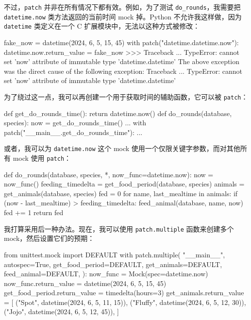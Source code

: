 不过，\texttt{patch} 并非在所有情况下都有效。例如，为了测试 \texttt{do\_rounds}，我需要把 \texttt{datetime.now} 类方法返回的当前时间 mock 掉。Python 不允许我这样做，因为 \texttt{datetime} 类定义在一个 C 扩展模块中，无法以这种方式被修改：

\begin{codebox}[python]
fake_now = datetime(2024, 6, 5, 15, 45)
with patch("datetime.datetime.now"):
    datetime.now.return_value = fake_now
>>>
Traceback ...
TypeError: cannot set 'now' attribute of immutable type
'datetime.datetime'
The above exception was the direct cause of the following
exception:
Traceback ...
TypeError: cannot set 'now' attribute of immutable type
'datetime.datetime'
\end{codebox}

为了绕过这一点，我可以再创建一个用于获取时间的辅助函数，它可以被 \texttt{patch}：

\begin{codebox}[python]
def get_do_rounds_time():
    return datetime.now()
def do_rounds(database, species):
    now = get_do_rounds_time()
    ...
with patch("__main__.get_do_rounds_time"):
    ...
\end{codebox}

或者，我可以为 \texttt{datetime.now} 这个 mock 使用一个仅限关键字参数，而对其他所有 mock 使用 \texttt{patch}：

\begin{codebox}[python]
def do_rounds(database, species, *, now_func=datetime.now):
    now = now_func()
    feeding_timedelta = get_food_period(database, species)
    animals = get_animals(database, species)
    fed = 0
    for name, last_mealtime in animals:
        if (now - last_mealtime) > feeding_timedelta:
            feed_animal(database, name, now)
            fed += 1
    return fed
\end{codebox}

我打算采用后一种办法。现在，我可以使用 \texttt{patch.multiple} 函数来创建多个 mock，然后设置它们的预期：

\begin{codebox}[python]
from unittest.mock import DEFAULT
with patch.multiple(
    "__main__",
    autospec=True,
    get_food_period=DEFAULT,
    get_animals=DEFAULT,
    feed_animal=DEFAULT,
):
    now_func = Mock(spec=datetime.now)
    now_func.return_value = datetime(2024, 6, 5, 15, 45)
    get_food_period.return_value = timedelta(hours=3)
    get_animals.return_value = [
        ("Spot", datetime(2024, 6, 5, 11, 15)),
        ("Fluffy", datetime(2024, 6, 5, 12, 30)),
        ("Jojo", datetime(2024, 6, 5, 12, 45)),
    ]
\end{codebox}

